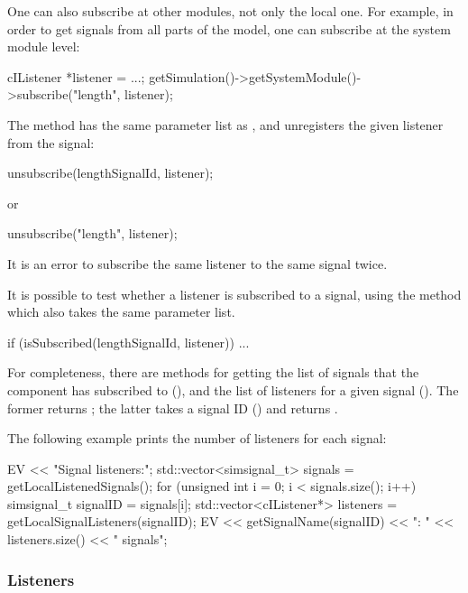 One can also subscribe at other modules, not only the local one.
For example, in order to get signals from all parts of the model,
one can subscribe at the system module level:

\begin{cpp}
cIListener *listener = ...;
getSimulation()->getSystemModule()->subscribe("length", listener);
\end{cpp}

The  method has the same parameter list
as , and unregisters the given listener
from the signal:

\begin{cpp}
unsubscribe(lengthSignalId, listener);
\end{cpp}

or

\begin{cpp}
unsubscribe("length", listener);
\end{cpp}

It is an error to subscribe the same listener to the same
signal twice.

It is possible to test whether a listener is subscribed to a signal,
using the  method which also takes the same
parameter list.

\begin{cpp}
if (isSubscribed(lengthSignalId, listener)) {
    ...
}
\end{cpp}

For completeness, there are methods for getting the list of signals
that the component has subscribed to (),
and the list of listeners for a given signal ().
The former returns ; the latter takes
a signal ID () and returns .

The following example prints the number of listeners for each signal:

\begin{cpp}
EV << "Signal listeners:\n";
std::vector<simsignal_t> signals = getLocalListenedSignals();
for (unsigned int i = 0; i < signals.size(); i++) {
    simsignal_t signalID = signals[i];
    std::vector<cIListener*> listeners = getLocalSignalListeners(signalID);
    EV << getSignalName(signalID) << ": " << listeners.size() << " signals\n";
}
\end{cpp}

\subsubsection{Listeners}
\label{sec:simple-modules:signal-listeners}


